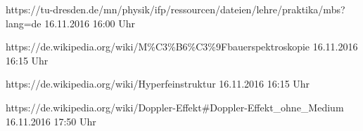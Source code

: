 \documentclass[german, %
parskip=full, %
bibliography=totoc, %
]{scrartcl}
\begin{document}

\begin{thebibliography}{9}

  https://tu-dresden.de/mn/physik/ifp/ressourcen/dateien/lehre/praktika/mbs?lang=de
	16.11.2016
	16:00 Uhr
	
  https://de.wikipedia.org/wiki/M\%C3\%B6\%C3\%9Fbauerspektroskopie
	16.11.2016
	16:15 Uhr
	
  https://de.wikipedia.org/wiki/Hyperfeinstruktur
	16.11.2016
	16:15 Uhr
	
  https://de.wikipedia.org/wiki/Doppler-Effekt\#Doppler-Effekt\_ohne\_Medium
	16.11.2016
	17:50 Uhr

\end{thebibliography}
\end{document}
